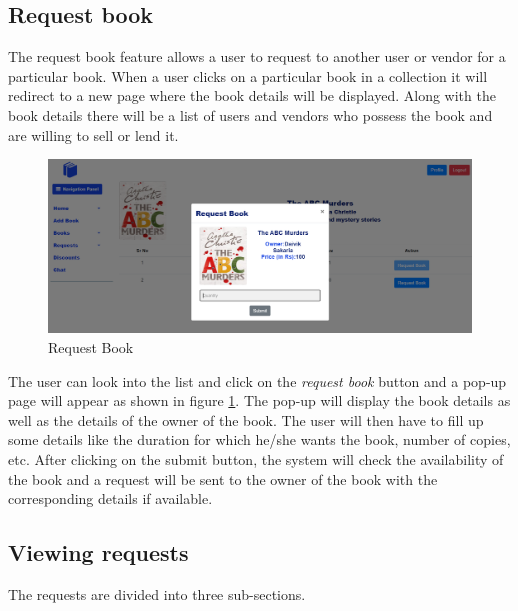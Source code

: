 \documentclass[conference]{IEEEtran}
\begin{document}
\subsection{Request book}
The request book feature allows a user to request to another user or vendor for a particular book. When a user clicks on a particular book in a collection it will redirect to a new page where the book details will be displayed. Along with the book details there will be a list of users and vendors who possess the book and are willing to sell or lend it. 
\begin{figure}[h]
     \centering
     \includegraphics[scale=0.20,margin=2,frame]{requestbook.PNG}
     \caption{Request Book}
     \label{fig:requestbook}
 \end{figure}
The user can look into the list and click on the \emph{request book} button and a pop-up page will appear as shown in figure \ref{fig:requestbook}. The pop-up will display the book details as well as the details of the owner of the book. The user will then have to fill up some details like the duration for which he/she wants the book, number of copies, etc. After clicking on the submit button, the system will check the availability of the book and a request will be sent to the owner of the book with the corresponding details if available. 

\subsection{Viewing requests}
The requests are divided into three sub-sections.
\end{document}
